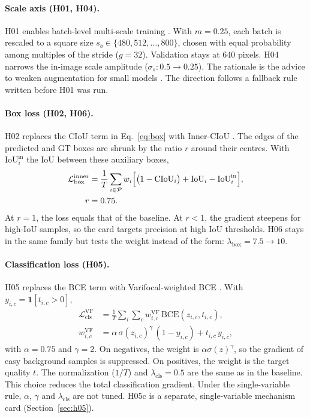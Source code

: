 \documentclass[pdflatex,iicol,sn-mathphys-num]{sn-jnl}
\begin{document}
\paragraph{Scale axis (H01, H04).}
H01 enables batch-level multi-scale training \cite{redmon_2017_yolo9000}. With $m=0.25$, each batch is rescaled to a square size $s_b\in\{480,512,\dots,800\}$, chosen with equal probability among multiples of the stride ($g=32$). Validation stays at 640 pixels. H04 narrows the in-image scale amplitude ($\sigma_s:0.5\to0.25$). The rationale is the advice to weaken augmentation for small models \cite{ge_2021_yolox}. The direction follows a fallback rule written before H01 was run.

\paragraph{Box loss (H02, H06).}
H02 replaces the CIoU term in Eq.~\eqref{eq:box} with Inner-CIoU \cite{zhang_2023_inneriou}. The edges of the predicted and GT boxes are shrunk by the ratio $r$ around their centres. With $\mathrm{IoU}^{\mathrm{in}}_i$ the IoU between these auxiliary boxes,
\begin{equation}\label{eq:inner}
\begin{aligned}
\mathcal L_{\mathrm{box}}^{\mathrm{inner}}&=\frac1T\sum_{i\in\mathcal P}w_i\Bigl[\bigl(1-\mathrm{CIoU}_i\bigr)+\mathrm{IoU}_i-\mathrm{IoU}^{\mathrm{in}}_i\Bigr],\\
r&=0.75.
\end{aligned}
\end{equation}
At $r=1$, the loss equals that of the baseline. At $r<1$, the gradient steepens for high-IoU samples, so the card targets precision at high IoU thresholds. H06 stays in the same family but tests the weight instead of the form: $\lambda_{\mathrm{box}}=7.5\to10$.

\paragraph{Classification loss (H05).}
H05 replaces the BCE term with Varifocal-weighted BCE \cite{zhang_2021_varifocalnet}. With $y_{i,c}=\mathbf{1}[t_{i,c}>0]$,
\begin{equation}\label{eq:vfl}
\begin{aligned}
\mathcal L_{\mathrm{cls}}^{\mathrm{VF}}&=\frac1T\sum_{i}\sum_{c}w^{\mathrm{VF}}_{i,c}\,\mathrm{BCE}(z_{i,c},t_{i,c}),\\
w^{\mathrm{VF}}_{i,c}&=\alpha\,\sigma(z_{i,c})^{\gamma}\,(1-y_{i,c})+t_{i,c}\,y_{i,c},
\end{aligned}
\end{equation}
with $\alpha=0.75$ and $\gamma=2$. On negatives, the weight is $\alpha\sigma(z)^{\gamma}$, so the gradient of easy background samples is suppressed. On positives, the weight is the target quality $t$. The normalization ($1/T$) and $\lambda_{\mathrm{cls}}=0.5$ are the same as in the baseline. This choice reduces the total classification gradient. Under the single-variable rule, $\alpha$, $\gamma$ and $\lambda_{\mathrm{cls}}$ are not tuned. H05c is a separate, single-variable mechanism card (Section~\ref{sec:h05}).
\end{document}
